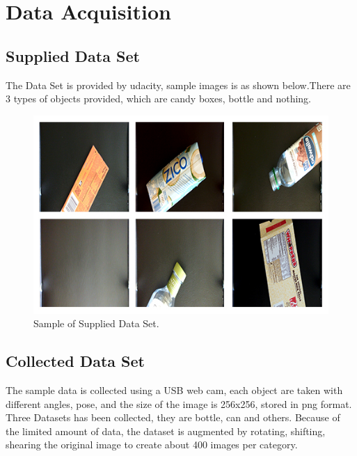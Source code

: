 \documentclass[10pt,journal,compsoc]{IEEEtran}
\begin{document}
\section{Data Acquisition}
\subsection{Supplied Data Set}
The Data Set is provided by udacity, sample images is as shown below.There are 3 types of objects provided, which are candy boxes, bottle and nothing.

\begin{figure}[thpb]
      \centering
      \includegraphics[width=\linewidth]{data-p1-digits}
      \caption{Sample of Supplied Data Set.}
      \label{fig:sample of Supplied Data Set}
\end{figure}

\subsection{Collected Data Set}
The sample data is collected using a USB web cam, each object are taken with different angles, pose, and the size of the image is 256x256, stored in png format. Three Datasets has been collected, they are bottle, can and others.
Because of the limited amount of data, the dataset is augmented by rotating, shifting, shearing the original image to create about 400 images per category. 
\end{document}
